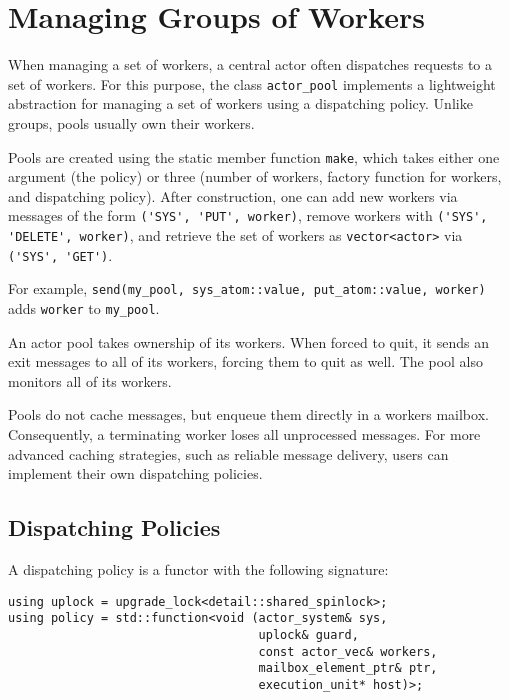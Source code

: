 \section{Managing Groups of Workers \experimental}
\label{worker-groups}

When managing a set of workers, a central actor often dispatches requests to a set of workers.
For this purpose, the class \lstinline^actor_pool^ implements a lightweight abstraction for managing a set of workers using a dispatching policy. Unlike groups, pools usually own their workers.

Pools are created using the static member function \lstinline^make^, which takes either one argument (the policy) or three (number of workers, factory function for workers, and dispatching policy).
After construction, one can add new workers via messages of the form \lstinline^('SYS', 'PUT', worker)^, remove workers with \lstinline^('SYS', 'DELETE', worker)^, and retrieve the set of workers as \lstinline^vector<actor>^ via \lstinline^('SYS', 'GET')^. 

For example, \lstinline^send(my_pool, sys_atom::value, put_atom::value, worker)^ adds \lstinline^worker^ to \lstinline^my_pool^.

An actor pool takes ownership of its workers.
When forced to quit, it sends an exit messages to all of its workers, forcing them to quit as well.
The pool also monitors all of its workers.

Pools do not cache messages, but enqueue them directly in a workers mailbox. Consequently, a terminating worker loses all unprocessed messages. For more advanced caching strategies, such as reliable message delivery, users can implement their own dispatching policies. 

\subsection{Dispatching Policies}

A dispatching policy is a functor with the following signature:

\begin{lstlisting}
using uplock = upgrade_lock<detail::shared_spinlock>;
using policy = std::function<void (actor_system& sys,
                                   uplock& guard,
                                   const actor_vec& workers,
                                   mailbox_element_ptr& ptr,
                                   execution_unit* host)>;
\end{lstlisting}

